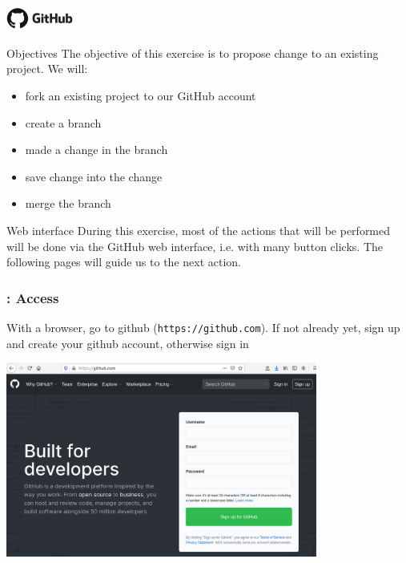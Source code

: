 \begin{frame}{\includegraphics[height=0.8cm]{shared/logo-github.png}}
\begin{exampleblock}{Objectives}
The objective of this exercise is to propose change to an existing project. We will:
\begin{itemize}
    \item fork an existing project to our GitHub account
    \item create a branch
    \item made a change in the branch
    \item save change into the change 
    \item merge the branch 
\end{itemize}
\end{exampleblock}
\begin{exampleblock}{Web interface}
 During this exercise, most of the actions that will be performed will be done via the GitHub web interface, i.e. with many button clicks. The following pages will guide us to the next action.
\end{exampleblock}
\end{frame}
\begin{frame}[containsverbatim]
\frametitle{: Access}
\begin{exampleblock}{}
With a browser, go to github (\verb|https://github.com|). If not already yet, sign up and create your github account, otherwise sign in
\begin{center}
    \includegraphics[height=6.4cm]{05_history/Images/FAIR_github_account.png}
\end{center}
\end{exampleblock}
\end{frame}
